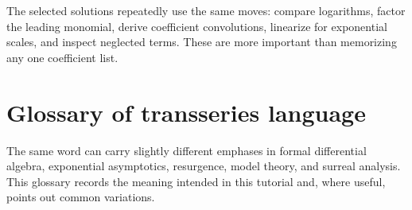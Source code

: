 \documentclass[11pt,openany]{book}
\theoremstyle{definition}
\theoremstyle{plain}
\theoremstyle{remark}
\begin{document}
\begin{summarybox}
The selected solutions repeatedly use the same moves: compare logarithms, factor the leading monomial, derive coefficient convolutions, linearize for exponential scales, and inspect neglected terms. These are more important than memorizing any one coefficient list.
\end{summarybox}


\chapter{Glossary of transseries language}\label{app:glossary}

The same word can carry slightly different emphases in formal differential
algebra, exponential asymptotics, resurgence, model theory, and surreal
analysis. This glossary records the meaning intended in this tutorial and,
where useful, points out common variations.
\end{document}
